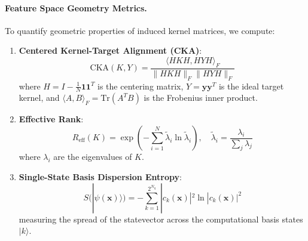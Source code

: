 \documentclass[10pt,twocolumn,letterpaper]{article}
\begin{document}
\paragraph{Feature Space Geometry Metrics.} To quantify geometric properties of induced kernel matrices, we compute:
\begin{enumerate}
    \item \textbf{Centered Kernel-Target Alignment (CKA)}:
    \begin{equation}
    \text{CKA}(K, Y) = \frac{\langle H K H, H Y H \rangle_F}{\|H K H\|_F \|H Y H\|_F}
    \end{equation}
    where $H = I - \frac{1}{N}\mathbf{1}\mathbf{1}^T$ is the centering matrix, $Y = \mathbf{y}\mathbf{y}^T$ is the ideal target kernel, and $\langle A, B \rangle_F = \text{Tr}(A^T B)$ is the Frobenius inner product.
    \item \textbf{Effective Rank}:
    \begin{equation}
    R_{\text{eff}}(K) = \exp\left( -\sum_{i=1}^N \tilde{\lambda}_i \ln \tilde{\lambda}_i \right), \quad \tilde{\lambda}_i = \frac{\lambda_i}{\sum_{j} \lambda_j}
    \end{equation}
    where $\lambda_i$ are the eigenvalues of $K$.
    \item \textbf{Single-State Basis Dispersion Entropy}:
    \begin{equation}
    S(|\psi(\mathbf{x})\rangle) = -\sum_{k=1}^{2^{N_q}} |c_k(\mathbf{x})|^2 \ln |c_k(\mathbf{x})|^2
    \end{equation}
    measuring the spread of the statevector across the computational basis states $|k\rangle$.
\end{enumerate}
\end{document}
